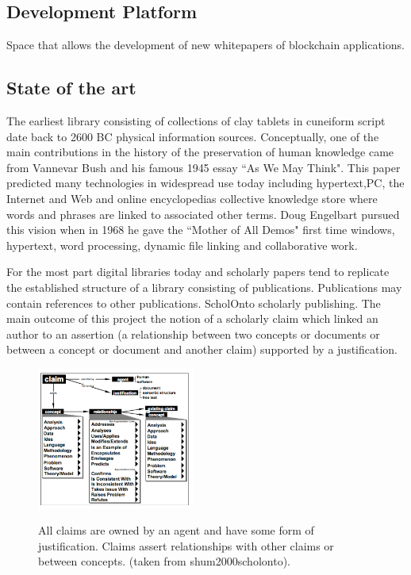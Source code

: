 \documentclass[twoside,twocolumn]{article}
\begin{document}
\subsection{Development Platform}
Space that allows the development of new whitepapers of blockchain applications.
 
\subsection{State of the art} 
The earliest library consisting of collections of clay tablets in cuneiform
script date back to 2600 BC %
physical information sources. Conceptually, one of the main contributions in the
history of the preservation of human knowledge came from Vannevar Bush and his
famous 1945 essay ``As We May Think". This paper predicted many technologies in
widespread use today including hypertext,PC, the Internet and Web and online
encyclopedias %
collective knowledge store where words and phrases are linked to associated
other terms. Doug Engelbart pursued this vision when in 1968 he gave the
``Mother of All Demos" %
first time windows, hypertext, word processing, dynamic file linking and
collaborative work.

For the most part digital libraries today and scholarly papers tend to replicate
the established structure of a library consisting of publications. Publications
may contain references to other publications. ScholOnto
scholarly publishing. The main outcome of this project the notion of a scholarly
claim which linked an author to an assertion (a relationship between two
concepts or documents or between a concept or document and another claim)
supported by a justification.

\begin{figure}[htbp]\centering
\caption{All claims are owned by an agent and have some form of justification.
Claims assert relationships with other claims or between concepts. (taken from shum2000scholonto).}
\includegraphics[width=0.46\textwidth]{scholonto-image}
\label{fig:scholonto}

\end{figure}
\end{document}
